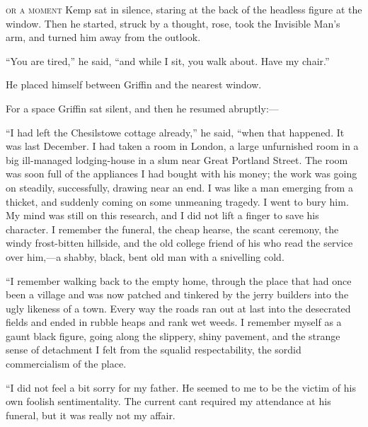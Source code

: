 \label{ch:20}
\begin{ChapterStart}
\vspace*{2\nbs}

\vspace{1.5\nbs}
\vspace{0.75\nbs}
\end{ChapterStart}

\kern-4pt\textsc{or a moment} Kemp sat in silence, staring at the back of the headless figure at the window. Then he started, struck by a thought, rose, took the Invisible Man’s arm, and turned him away from the outlook.

“You are tired,” he said, “and while I sit, you walk about. Have my chair.”

He placed himself between Griffin and the nearest window.

For a space Griffin sat silent, and then he resumed abruptly:—

“I had left the Chesilstowe cottage already,” he said, “when that happened. It was last December. I had taken a room in London, a large unfurnished room in a big ill-managed lodging-house in a slum near Great Portland Street. The room was soon full of the appliances I had bought with his money; the work was going on steadily, successfully, drawing near an end. I was like a man emerging from a thicket, and suddenly coming on some unmeaning tragedy. I went to bury him. My mind was still on this research, and I did not lift a finger to save his character. I remember the funeral, the cheap hearse, the scant ceremony, the windy frost-bitten hillside, and the old college friend of his who read the service over him,—a shabby, black, bent old man with a snivelling cold.

“I remember walking back to the empty home, through the place that had once been a village and was now patched and tinkered by the jerry builders into the ugly likeness of a town. Every way the roads ran out at last into the desecrated fields and ended in rubble heaps and rank wet weeds. I remember myself as a gaunt black figure, going along the slippery, shiny pavement, and the strange sense of detachment I felt from the squalid respectability, the sordid commercialism of the place.

“I did not feel a bit sorry for my father. He seemed to me to be the victim of his own foolish sentimentality. The current cant required my attendance at his funeral, but it was really not my affair.

